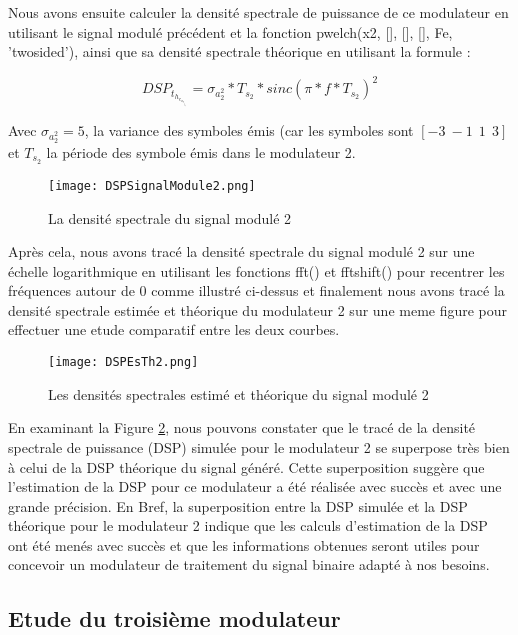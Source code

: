 \documentclass[11pt]{article}
\begin{document}
Nous avons ensuite calculer la densité spectrale de puissance de ce modulateur en utilisant le signal modulé précédent et la fonction pwelch(x2, [], [], [], Fe, 'twosided'), ainsi que sa densité spectrale théorique en utilisant la formule :

$$ DSP_t_h_e_o_r_i_q_u_e_2 = \sigma_a_2^{2} * T_s_2 * sinc(\pi*f*T_s_2)^{2} $$

Avec $\sigma_a_2^{2} = 5$, la variance des symboles émis (car les symboles sont $[-3 \ -1 \ \ 1 \ \ 3]$ et $T_s_2$ la période des symbole émis dans le modulateur 2.

\begin{figure}[ht!]
            \centering
            \texttt{[image: DSPSignalModule2.png]}
            \caption{La densité spectrale du signal modulé 2 \label{fig : DSPSignalModule2}}
        \end{figure}
Après cela, nous avons tracé la densité spectrale du signal modulé 2 sur une échelle logarithmique en utilisant les fonctions fft() et fftshift() pour recentrer les fréquences autour de 0 comme illustré ci-dessus et finalement nous avons tracé la densité spectrale estimée et théorique du modulateur 2 sur une meme figure pour effectuer une etude comparatif entre les deux courbes.

\begin{figure}[ht!]
            \centering
            \texttt{[image: DSPEsTh2.png]}
            \caption{Les densités spectrales estimé et théorique du signal modulé 2 \label{fig : DSPEsThSignalModule2}}
        \end{figure}

En examinant la Figure \ref{fig : DSPEsThSignalModule2}, nous pouvons constater que le tracé de la densité spectrale de puissance (DSP) simulée pour le modulateur 2 se superpose très bien à celui de la DSP théorique du signal généré. Cette superposition suggère que l'estimation de la DSP pour ce modulateur a été réalisée avec succès et avec une grande précision.
En Bref, la superposition entre la DSP simulée et la DSP théorique pour le modulateur 2 indique que les calculs d'estimation de la DSP ont été menés avec succès et que les informations obtenues seront utiles pour concevoir un modulateur de traitement du signal binaire adapté à nos besoins.

    \subsection{Etude du troisième modulateur}
\end{document}

